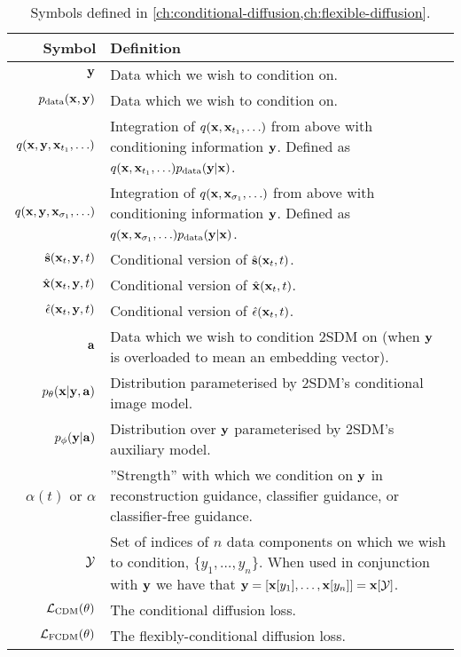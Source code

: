 \begin{table*}
  \caption{Symbols defined in \cref{ch:conditional-diffusion,ch:flexible-diffusion}.}
  \label{tab:notation-appendix-conditional-diffusion}
  \centering
  \footnotesize
  \begin{tabular}{rp{9cm}}
    \toprule
    Symbol    & Definition   \\
    \midrule
    ${\mathbf{y}}$                                  & Data which we wish to condition on. \\
    $p_{\rm{data}}({\mathbf{x}}, {\mathbf{y}})$                    & Data which we wish to condition on. \\
    $q({\mathbf{x}},{\mathbf{y}},{\mathbf{x}}_{t_1},\ldots)$        & Integration of $q({\mathbf{x}},{\mathbf{x}}_{t_1},\ldots)$ from above with conditioning information ${\mathbf{y}}$. Defined as $q({\mathbf{x}},{\mathbf{x}}_{t_1},\ldots)p_{\rm{data}}({\mathbf{y}}|{\mathbf{x}})$.   \\
    $q({\mathbf{x}},{\mathbf{y}},{\mathbf{x}}_{\sigma_1},\ldots)$   & Integration of $q({\mathbf{x}},{\mathbf{x}}_{\sigma_1},\ldots)$ from above with conditioning information ${\mathbf{y}}$. Defined as $q({\mathbf{x}},{\mathbf{x}}_{\sigma_1},\ldots)p_{\rm{data}}({\mathbf{y}}|{\mathbf{x}})$.   \\
    $\hat{{\mathbf{s}}}({\mathbf{x}}_t, {\mathbf{y}}, t)$                     & Conditional version of $\hat{{\mathbf{s}}}({\mathbf{x}}_t, t)$. \\
    $\hat{{\mathbf{x}}}({\mathbf{x}}_t, {\mathbf{y}}, t)$                     & Conditional version of $\hat{{\mathbf{x}}}({\mathbf{x}}_t, t)$. \\
    $\hat{\mathbf{\epsilon}}({\mathbf{x}}_t, {\mathbf{y}}, t)$                     & Conditional version of $\hat{\mathbf{\epsilon}}({\mathbf{x}}_t, t)$. \\
    ${\mathbf{a}}$  & Data which we wish to condition 2SDM on (when ${\mathbf{y}}$ is overloaded to mean an embedding vector). \\
    $p_\theta({\mathbf{x}}|{\mathbf{y}},{\mathbf{a}})$                    & Distribution parameterised by 2SDM's conditional image model. \\
    $p_\phi({\mathbf{y}}|{\mathbf{a}})$                           & Distribution over ${\mathbf{y}}$ parameterised by 2SDM's auxiliary model. \\
    $\alpha(t)$ or $\alpha$                       & ''Strength'' with which we condition on ${\mathbf{y}}$ in reconstruction guidance, classifier guidance, or classifier-free guidance.  \\
    ${\mathcal{Y}}$                                         &   Set of indices of $n$ data components on which we wish to condition, $\{y_1, \ldots, y_n\}$. When used in conjunction with ${\mathbf{y}}$ we have that ${\mathbf{y}} = [{\mathbf{x}}[y_1], \ldots, {\mathbf{x}}[y_n]] = {\mathbf{x}}[{\mathcal{Y}}]$. \\
    ${\mathcal{L}}_\text{CDM}(\theta)$                      & The conditional diffusion loss. \\
    ${\mathcal{L}}_\text{FCDM}(\theta)$                      & The flexibly-conditional diffusion loss. \\
    \bottomrule
  \end{tabular}
\end{table*}


